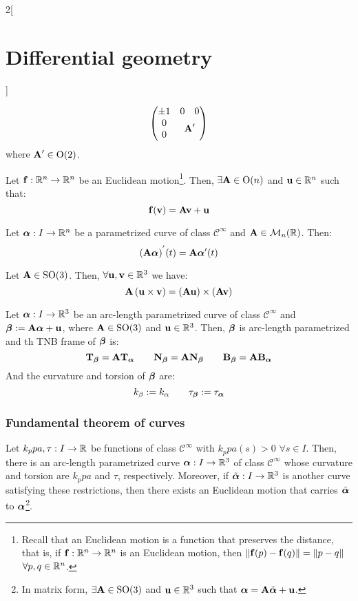 \documentclass[../../../main.tex]{subfiles}
\begin{document}
\begin{multicols}{2}[\section{Differential geometry}]
\begin{proposition}
$$\begin{pmatrix}
        \pm 1 & 0                                              & 0 \\
        0     & \multicolumn{2}{c}{\multirow{2}{*}{$\vf{A}'$}}     \\
        0     &                                                &
      \end{pmatrix}$$
    where $\boldsymbol{\mathrm{A}}'\in\text{O}(2)$.
  \end{proposition}
  \begin{proposition}
    Let $\boldsymbol{\mathrm{f}}:\mathbb{R}^n\rightarrow\mathbb{R}^n$ be an Euclidean motion\footnote{Recall that an Euclidean motion is a function that preserves the distance, that is, if $\boldsymbol{\mathrm{f}}:\mathbb{R}^n\rightarrow\mathbb{R}^n$ is an Euclidean motion, then $\|\boldsymbol{\mathrm{f}}(p)-\boldsymbol{\mathrm{f}}(q)\|=\|p-q\|$ $\forall p,q\in\mathbb{R}^n$.}. Then, $\exists\boldsymbol{\mathrm{A}}\in\text{O}(n)$ and $\boldsymbol{\mathrm{u}}\in\mathbb{R}^n$ such that: $$\boldsymbol{\mathrm{f}}(\boldsymbol{\mathrm{v}})=\boldsymbol{\mathrm{Av}}+\boldsymbol{\mathrm{u}}$$
  \end{proposition}
  \begin{proposition}
    Let $\boldsymbol{\mathrm{\alpha}}:I\rightarrow\mathbb{R}^n$ be a parametrized curve of class $\mathcal{C}^\infty$ and $\boldsymbol{\mathrm{A}}\in\mathcal{M}_n(\mathbb{R})$. Then:
    $${\left(\boldsymbol{\mathrm{A}}\boldsymbol{\mathrm{\alpha}}\right)}^{'}(t)=\boldsymbol{\mathrm{A}}\boldsymbol{\mathrm{\alpha}}'(t)$$
  \end{proposition}
  \begin{proposition}
    Let $\boldsymbol{\mathrm{A}}\in\text{SO}(3)$. Then, $\forall \boldsymbol{\mathrm{u}},\boldsymbol{\mathrm{v}}\in\mathbb{R}^3$ we have: $$\boldsymbol{\mathrm{A}}\left(\boldsymbol{\mathrm{u}}\times\boldsymbol{\mathrm{v}}\right)=\left(\boldsymbol{\mathrm{Au}}\right)\times\left(\boldsymbol{\mathrm{Av}}\right)$$
  \end{proposition}
  \begin{corollary}
    Let $\boldsymbol{\mathrm{\alpha}}:I\rightarrow\mathbb{R}^3$ be an arc-length parametrized curve of class $\mathcal{C}^\infty$ and $\boldsymbol{\mathrm{\beta}}:=\boldsymbol{\mathrm{A\alpha}}+\boldsymbol{\mathrm{u}}$, where $\boldsymbol{\mathrm{A}}\in\text{SO}(3)$ and $\boldsymbol{\mathrm{u}}\in\mathbb{R}^3$. Then, $\boldsymbol{\mathrm{\beta}}$ is arc-length parametrized and th TNB frame of $\boldsymbol{\mathrm{\beta}}$ is:
    $${\boldsymbol{\mathrm{T}}_{\boldsymbol{\mathrm{\beta}}}}=\boldsymbol{\mathrm{A}}{\boldsymbol{\mathrm{T}}_{\boldsymbol{\mathrm{\alpha}}}}\qquad{\boldsymbol{\mathrm{N}}_{\boldsymbol{\mathrm{\beta}}}}=\boldsymbol{\mathrm{A}}{\boldsymbol{\mathrm{N}}_{\boldsymbol{\mathrm{\beta}}}}\qquad{\boldsymbol{\mathrm{B}}_{\boldsymbol{\mathrm{\beta}}}}=\boldsymbol{\mathrm{A}}{\boldsymbol{\mathrm{B}}_{\boldsymbol{\mathrm{\alpha}}}}$$
    And the curvature and torsion of $\boldsymbol{\mathrm{\beta}}$ are: $$k_\beta:=k_\alpha\qquad{\tau_{\boldsymbol{\mathrm{\beta}}}}:={\tau_{\boldsymbol{\mathrm{\alpha}}}}$$
  \end{corollary}
  \subsubsection{Fundamental theorem of curves}
  \begin{theorem}
    Let $k_ppa,\tau:I\rightarrow\mathbb{R}$ be functions of class $\mathcal{C}^\infty$ with $k_ppa(s)>0$ $\forall s\in I$. Then, there is an arc-length parametrized curve $\boldsymbol{\mathrm{\alpha}}:I\rightarrow\mathbb{R}^3$ of class $\mathcal{C}^\infty$ whose curvature and torsion are $k_ppa$ and $\tau$, respectively. Moreover, if $\tilde{\boldsymbol{\mathrm{\alpha}}}:I\rightarrow\mathbb{R}^3$ is another curve satisfying these restrictions, then there exists an Euclidean motion that carries $\tilde{\boldsymbol{\mathrm{\alpha}}}$ to $\boldsymbol{\mathrm{\alpha}}$\footnote{In matrix form, $\exists\boldsymbol{\mathrm{A}}\in\text{SO}(3)$ and $\boldsymbol{\mathrm{u}}\in\mathbb{R}^3$ such that $\boldsymbol{\mathrm{\alpha}}=\boldsymbol{\mathrm{A}}\tilde{\boldsymbol{\mathrm{\alpha}}}+\boldsymbol{\mathrm{u}}$.}.
  \end{theorem}

\end{multicols}
\end{document}
